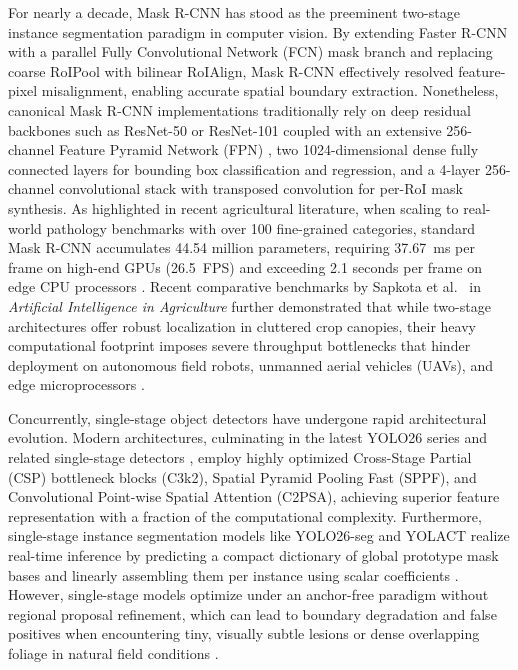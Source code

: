 \documentclass[5p,times]{elsarticle}
\begin{document}
For nearly a decade, Mask R-CNN \cite{he2017mask} has stood as the preeminent two-stage instance segmentation paradigm in computer vision. By extending Faster R-CNN with a parallel Fully Convolutional Network (FCN) mask branch and replacing coarse RoIPool with bilinear RoIAlign, Mask R-CNN effectively resolved feature-pixel misalignment, enabling accurate spatial boundary extraction. Nonetheless, canonical Mask R-CNN implementations traditionally rely on deep residual backbones such as ResNet-50 or ResNet-101 \cite{he2016deep} coupled with an extensive 256-channel Feature Pyramid Network (FPN) \cite{lin2017feature}, two 1024-dimensional dense fully connected layers for bounding box classification and regression, and a 4-layer 256-channel convolutional stack with transposed convolution for per-RoI mask synthesis. As highlighted in recent agricultural literature, when scaling to real-world pathology benchmarks with over 100 fine-grained categories, standard Mask R-CNN accumulates 44.54 million parameters, requiring 37.67~ms per frame on high-end GPUs (26.5~FPS) and exceeding 2.1 seconds per frame on edge CPU processors \cite{liu2021plant, devi2024high, zhang2024tinysegformer}. Recent comparative benchmarks by Sapkota et al.\ \cite{sapkota2024comparing} in \textit{Artificial Intelligence in Agriculture} further demonstrated that while two-stage architectures offer robust localization in cluttered crop canopies, their heavy computational footprint imposes severe throughput bottlenecks that hinder deployment on autonomous field robots, unmanned aerial vehicles (UAVs), and edge microprocessors \cite{sapkota2024comparing, karacaoglu2025optimized, kim2026ahco}.

Concurrently, single-stage object detectors have undergone rapid architectural evolution. Modern architectures, culminating in the latest YOLO26 series and related single-stage detectors \cite{jocher2026yolo26, wang2023yolov7, reis2023real}, employ highly optimized Cross-Stage Partial (CSP) bottleneck blocks (C3k2), Spatial Pyramid Pooling Fast (SPPF), and Convolutional Point-wise Spatial Attention (C2PSA), achieving superior feature representation with a fraction of the computational complexity. Furthermore, single-stage instance segmentation models like YOLO26-seg and YOLACT \cite{bolya2019yolact} realize real-time inference by predicting a compact dictionary of global prototype mask bases and linearly assembling them per instance using scalar coefficients \cite{bolya2019yolact, dharwadkar2024enhanced}. However, single-stage models optimize under an anchor-free paradigm without regional proposal refinement, which can lead to boundary degradation and false positives when encountering tiny, visually subtle lesions or dense overlapping foliage in natural field conditions \cite{sapkota2024comparing, dalan2026calabashseg, li2026comparison, wang2026tgl}.
\end{document}
